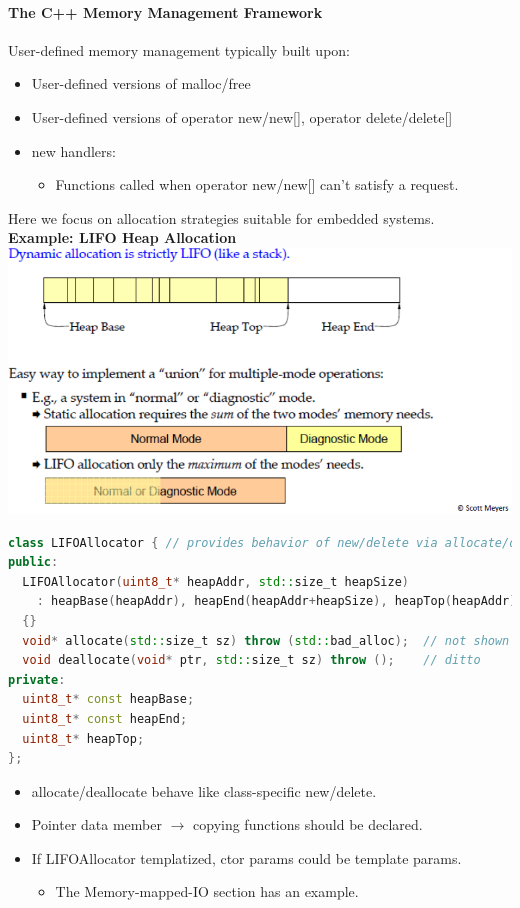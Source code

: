 \paragraph{The C++ Memory Management Framework}
User-defined memory management typically built upon:
\begin{itemize}
  \item User-defined versions of malloc/free
  \item User-defined versions of operator new/new[], operator delete/delete[]
  \item new handlers:
  \begin{itemize}
    \item Functions called when operator new/new[] can't satisfy a request.
  \end{itemize}
\end{itemize}
Here we focus on allocation strategies suitable for embedded systems.\\

\textbf{Example: LIFO Heap Allocation}\\
\includegraphics[width=0.7\linewidth]{images/AdvancedCPP/lifo}

\begin{lstlisting}[language=C++]
class LIFOAllocator { // provides behavior of new/delete via allocate/deallocate
public:
  LIFOAllocator(uint8_t* heapAddr, std::size_t heapSize)
    : heapBase(heapAddr), heapEnd(heapAddr+heapSize), heapTop(heapAddr)
  {}
  void* allocate(std::size_t sz) throw (std::bad_alloc);  // not shown
  void deallocate(void* ptr, std::size_t sz) throw ();    // ditto
private:
  uint8_t* const heapBase;
  uint8_t* const heapEnd;
  uint8_t* heapTop;
};
\end{lstlisting}
\begin{itemize}
  \item allocate/deallocate behave like class-specific new/delete.
  \item Pointer data member $\rightarrow$ copying functions should be declared.
  \item If LIFOAllocator templatized, ctor params could be template params.
  \begin{itemize}
    \item The Memory-mapped-IO section has an example.
  \end{itemize}
\end{itemize}

